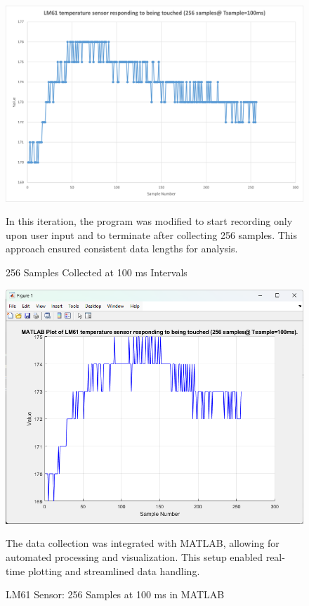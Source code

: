 \documentclass[journal]{IEEEtran}
\begin{document}
\vspace{-10mm} %

\begin{figure}[H]
    \centering
    \includegraphics[width=\linewidth]{3.1.png}
    \caption{256 Samples Collected at 100 ms Intervals}
    \begin{minipage}{\linewidth}
      In this iteration, the program was modified to start recording only upon user input and to terminate after collecting 256 samples. This approach ensured consistent data lengths for analysis.
    \end{minipage}
    \label{fig:part3_256_samples}
\end{figure}

\vspace{-10mm} %

\begin{figure}[H]
    \centering
    \includegraphics[width=\linewidth]{4.1.png}
    \caption{LM61 Sensor: 256 Samples at 100 ms in MATLAB}
    \begin{minipage}{\linewidth}
      The data collection was integrated with MATLAB, allowing for automated processing and visualization. This setup enabled real-time plotting and streamlined data handling.
    \end{minipage}
    \label{fig:part4_matlab}
\end{figure}
\end{document}
